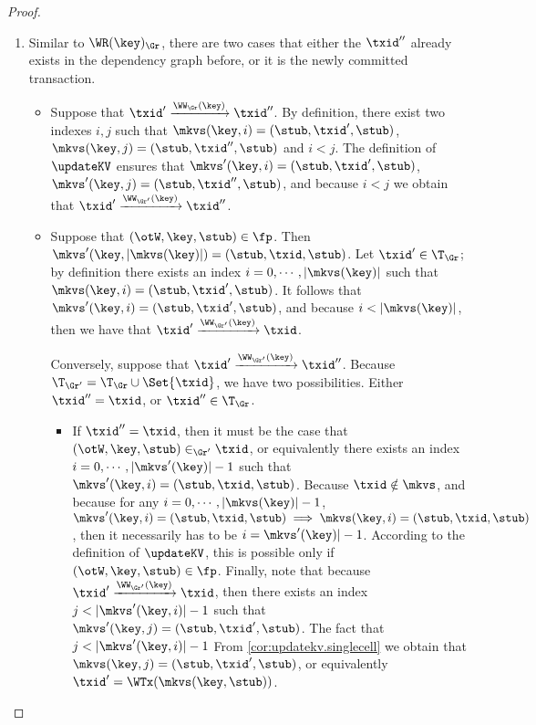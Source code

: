 \begin{proof}
\begin{enumerate}
\item 
Similar to \( \WR(\key)_{\Gr} \), there are two cases that either the \( \txid'' \) already exists in the dependency graph before,
or it is the newly committed transaction.
\begin{itemize}
\item Suppose that $\txid' \xrightarrow{\WW_{\Gr}(\key)} \txid''$. 
By definition, there exist two indexes $i, j$ such that 
$\mkvs(\key, i) = (\stub, \txid', \stub)$, $\mkvs(\key, j) = (\stub, \txid'', \stub)$ 
and $i < j$. The definition of $\updateKV$ ensures that 
$\mkvs'(\key, i) = (\stub, \txid', \stub)$, $\mkvs'(\key, j) = (\stub, \txid'', \stub)$, 
and because $i < j$ we obtain that $\txid' \xrightarrow{\WW_{\Gr'}(\key)} \txid''$. 

\item Suppose that $(\otW, \key, \stub) \in \fp$. Then $\mkvs'(\key, \lvert \mkvs(\key) \rvert) = (\stub, \txid, \stub)$.
Let $\txid' \in \T_{\Gr}$; by definition there exists an index $i = 0,\cdots, \lvert \mkvs(\key) \rvert$ 
such that $\mkvs(\key, i) = (\stub, \txid', \stub)$. It follows that $\mkvs'(\key, i) = (\stub, \txid', \stub)$, and 
because $i < \lvert \mkvs(\key) \rvert$, then we have that $\txid' \xrightarrow{\WW_{\Gr'}(\key)} \txid$. 

Conversely, suppose that $\txid' \xrightarrow{\WW_{\Gr'}(\key)} \txid''$. Because 
$\T_{\Gr'} = \T_{\Gr} \cup \Set{ \txid }$, we have two possibilities. Either $\txid'' = \txid$, 
or $\txid'' \in \T_{\Gr}$. 

\begin{itemize}
\item If $\txid'' = \txid$, then it must be the case that $(\otW, \key, \stub) \in_{\Gr'} \txid$, 
or equivalently there exists an index $i=0,\cdots, \lvert \mkvs'(\key) \rvert -1 $ such that 
$\mkvs'(\key, i) = (\stub, \txid, \stub)$. Because $\txid \notin \mkvs$, and because for any 
$i = 0, \cdots, \lvert \mkvs(\key) \rvert - 1$, $\mkvs'(\key, i) = (\stub, \txid, \stub) \implies 
\mkvs(\key, i) = (\stub, \txid, \stub)$, then it necessarily has to be $i = \mkvs'(\key) \rvert - 1$. 
According to the definition of $\updateKV$, this is possible only if $(\otW,\key, \stub) \in \fp$. 
Finally, note that because $\txid' \xrightarrow{\WW_{\Gr'}(\key)} \txid$, then 
there exists an index $j < \lvert \mkvs'(\key, i) \rvert - 1$ such that 
$\mkvs'(\key, j) = (\stub, \txid' ,\stub)$. The fact that $j < \lvert \mkvs'(\key, i) \rvert - 1$ 
From \cref{cor:updatekv.singlecell} we obtain that $\mkvs(\key, j) = (\stub, \txid', \stub)$, 
or equivalently $\txid' = \WTx(\mkvs(\key, \stub))$. 


\end{itemize}
\end{itemize}
\end{enumerate}
\end{proof}
